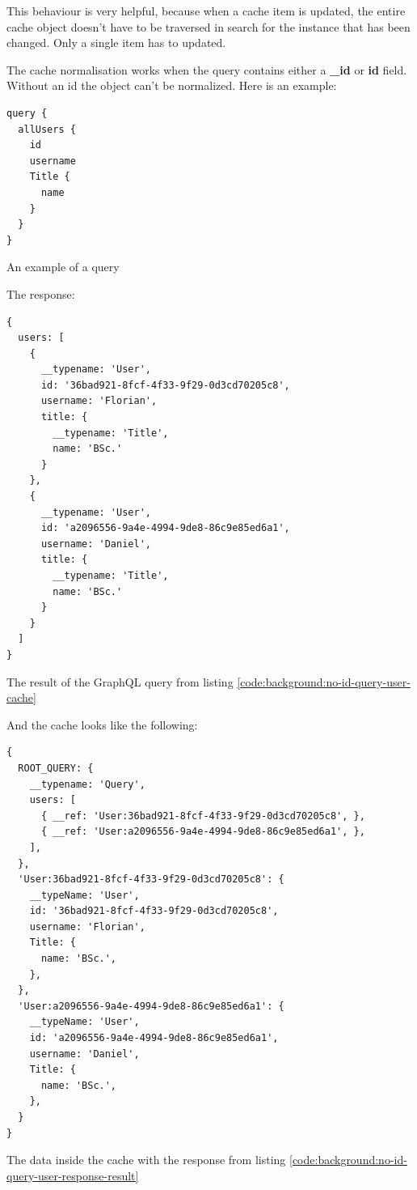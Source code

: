 This behaviour is very helpful, because when a cache item is updated, the entire cache object doesn't have to be traversed in search for the instance that has been changed. Only a single item has to updated.

The cache normalisation works when the query contains either a \textbf{\_id} or \textbf{id} field. Without an id the object can't be normalized. Here is an example:

\ifshowListings
\begin{listing}[H]
\begin{verbatim}
query {
  allUsers {
    id
    username
    Title {
      name
    }
  }
}
\end{verbatim}
\caption{An example of a query}\label{code:background:no-id-query-user-cache}
\end{listing}
\fi

The response: 

\ifshowListings
\begin{listing}[H]
\begin{verbatim}
{
  users: [
    {
      __typename: 'User',
      id: '36bad921-8fcf-4f33-9f29-0d3cd70205c8',
      username: 'Florian',
      title: {
        __typename: 'Title',
        name: 'BSc.'
      }
    }, 
    {
      __typename: 'User',
      id: 'a2096556-9a4e-4994-9de8-86c9e85ed6a1',
      username: 'Daniel',
      title: {
        __typename: 'Title',
        name: 'BSc.'
      }
    }
  ]
}
\end{verbatim}
\caption{The result of the GraphQL query from listing \ref{code:background:no-id-query-user-cache}}\label{code:background:no-id-query-user-response-result}
\end{listing}
\fi

And the cache looks like the following:

\ifshowListings
\begin{listing}[H]
\begin{verbatim}
{
  ROOT_QUERY: {
    __typename: 'Query',
    users: [
      { __ref: 'User:36bad921-8fcf-4f33-9f29-0d3cd70205c8', },
      { __ref: 'User:a2096556-9a4e-4994-9de8-86c9e85ed6a1', },
    ],
  },
  'User:36bad921-8fcf-4f33-9f29-0d3cd70205c8': {
    __typeName: 'User',
    id: '36bad921-8fcf-4f33-9f29-0d3cd70205c8',
    username: 'Florian',
    Title: {
      name: 'BSc.',
    },
  },
  'User:a2096556-9a4e-4994-9de8-86c9e85ed6a1': {
    __typeName: 'User',
    id: 'a2096556-9a4e-4994-9de8-86c9e85ed6a1',
    username: 'Daniel',
    Title: {
      name: 'BSc.',
    },
  }
}
\end{verbatim}
\caption{The data inside the cache with the response from listing \ref{code:background:no-id-query-user-response-result}}\label{code:background:no-id-query-user-cache-representation}
\end{listing}
\fi

